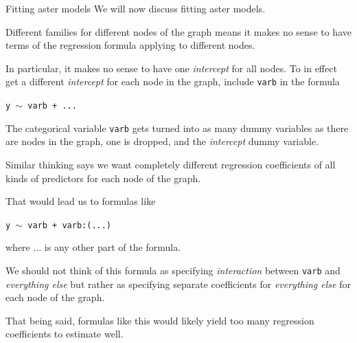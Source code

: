 \documentclass[
  ignorenonframetext,
]{beamer}
\begin{document}
\begin{frame}{Fitting aster models}
\protect\hypertarget{fitting-aster-models}{}
We will now discuss fitting aster models.

Different families for different nodes of the graph means it makes no
sense to have terms of the regression formula applying to different
nodes.

In particular, it makes no sense to have one \emph{intercept} for all
nodes. To in effect get a different \emph{intercept} for each node in
the graph, include \texttt{varb} in the formula

\begin{center}
  \texttt{y $\sim$ varb + ...}
\end{center}

The categorical variable \texttt{varb} gets turned into as many dummy
variables as there are nodes in the graph, one is dropped, and the
\emph{intercept} dummy variable.
\end{frame}

\begin{frame}{}
\protect\hypertarget{section-15}{}
Similar thinking says we want completely different regression
coefficients of all kinds of predictors for each node of the graph.

That would lead us to formulas like

\begin{center}
  \texttt{y $\sim$ varb + varb:(...)}
\end{center}

where \(\ldots\) is any other part of the formula.

We should not think of this formula as specifying \emph{interaction}
between \texttt{varb} and \emph{everything else} but rather as
specifying separate coefficients for \emph{everything else} for each
node of the graph.

That being said, formulas like this would likely yield too many
regression coefficients to estimate well.
\end{frame}
\end{document}
